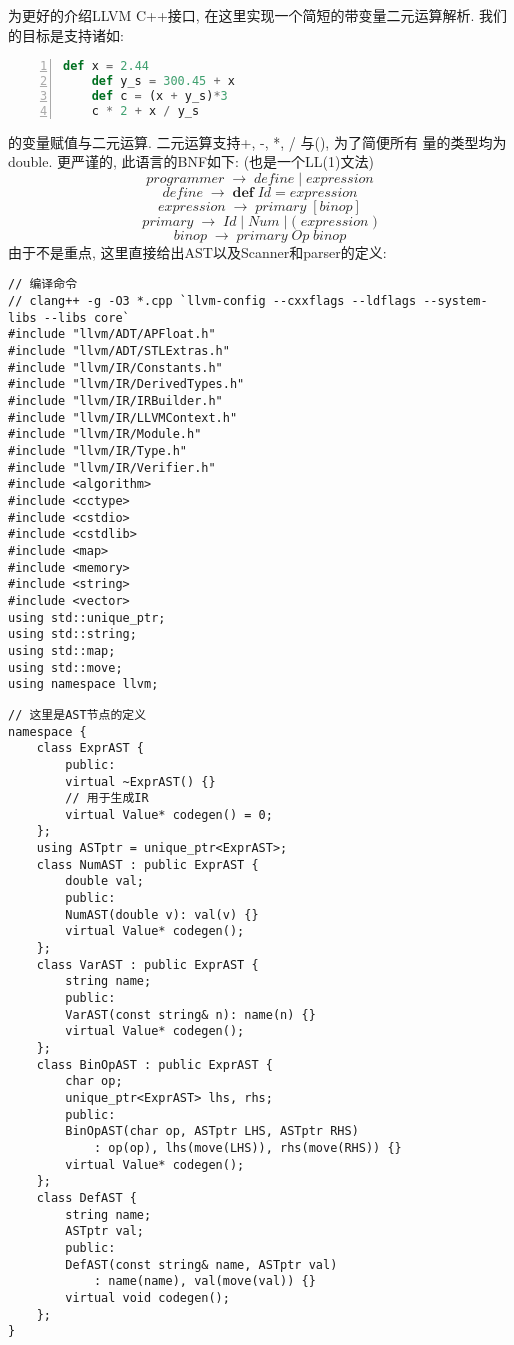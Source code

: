 \documentclass[UTF8]{ctexart}
\begin{document}
为更好的介绍LLVM C++接口, 在这里实现一个简短的带变量二元运算解析.
我们的目标是支持诸如:
\begin{lstlisting}[language = Python, numbers=left, numberstyle=\tiny]
    def x = 2.44
    def y_s = 300.45 + x
    def c = (x + y_s)*3
    c * 2 + x / y_s
\end{lstlisting}
的变量赋值与二元运算. 二元运算支持+, -, *, / 与(), 为了简便所有
量的类型均为double. 更严谨的, 此语言的BNF如下: (也是一个LL(1)文法)
\begin{equation}
    programmer \; \rightarrow \; define \; | \; expression 
\end{equation}
\begin{equation}
    define \; \rightarrow \; \textbf{def} \; Id \; \textbf{=} \; expression 
\end{equation}
\begin{equation}
    expression \; \rightarrow \; primary \; [binop]
\end{equation}
\begin{equation}
    primary \; \rightarrow \; Id \; 
                    | \; Num \; 
                    | \; \textbf{(} \; expression \; \textbf{)}
\end{equation}
\begin{equation} 
    binop \; \rightarrow \; primary \; Op \; binop
\end{equation}
由于不是重点, 这里直接给出AST以及Scanner和parser的定义:
\begin{lstlisting}[title=头文件, frame=shadowbox]
// 编译命令
// clang++ -g -O3 *.cpp `llvm-config --cxxflags --ldflags --system-libs --libs core`
#include "llvm/ADT/APFloat.h"
#include "llvm/ADT/STLExtras.h"
#include "llvm/IR/Constants.h"
#include "llvm/IR/DerivedTypes.h"
#include "llvm/IR/IRBuilder.h"
#include "llvm/IR/LLVMContext.h"
#include "llvm/IR/Module.h"
#include "llvm/IR/Type.h"
#include "llvm/IR/Verifier.h"
#include <algorithm>
#include <cctype>
#include <cstdio>
#include <cstdlib>
#include <map>
#include <memory>
#include <string>
#include <vector>
using std::unique_ptr;
using std::string;
using std::map;
using std::move;
using namespace llvm;
\end{lstlisting}
\begin{lstlisting}[title=AST, frame=shadowbox]
// 这里是AST节点的定义
namespace {
    class ExprAST {
        public:
        virtual ~ExprAST() {}
        // 用于生成IR
        virtual Value* codegen() = 0;
    };
    using ASTptr = unique_ptr<ExprAST>;
    class NumAST : public ExprAST { 
        double val;
        public: 
        NumAST(double v): val(v) {}
        virtual Value* codegen();
    };
    class VarAST : public ExprAST {
        string name;
        public:
        VarAST(const string& n): name(n) {}
        virtual Value* codegen();
    };
    class BinOpAST : public ExprAST {
        char op;
        unique_ptr<ExprAST> lhs, rhs;
        public:
        BinOpAST(char op, ASTptr LHS, ASTptr RHS) 
            : op(op), lhs(move(LHS)), rhs(move(RHS)) {}
        virtual Value* codegen();
    };
    class DefAST {
        string name;
        ASTptr val;
        public:
        DefAST(const string& name, ASTptr val) 
            : name(name), val(move(val)) {}
        virtual void codegen();
    };
}
\end{lstlisting}
\end{document}
